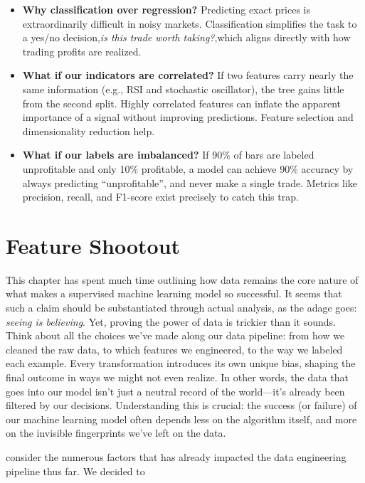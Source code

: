 \begin{tcolorbox}[enhanced, breakable,
  colback=pipegold!8!white,
  colframe=pipegold!80!black,
  fonttitle=\bfseries\sffamily,
  title={Principles and Pitfalls}]
\label{sec:pitfalls}
\begin{itemize}
  \item \textbf{Why classification over regression?} Predicting exact prices is extraordinarily difficult in noisy markets. Classification simplifies the task to a yes/no decision,\textit{is this trade worth taking?},which aligns directly with how trading profits are realized.
  \item \textbf{What if our indicators are correlated?} If two features carry nearly the same information (e.g., RSI and stochastic oscillator), the tree gains little from the second split. Highly correlated features can inflate the apparent importance of a signal without improving predictions. Feature selection and dimensionality reduction help.
  \item \textbf{What if our labels are imbalanced?} If 90\% of bars are labeled unprofitable and only 10\% profitable, a model can achieve 90\% accuracy by always predicting ``unprofitable'', and never make a single trade. Metrics like precision, recall, and F1-score exist precisely to catch this trap.
\end{itemize}
\end{tcolorbox}

\section{Feature Shootout}

This chapter has spent much time outlining how data remains the core nature of what makes a supervised machine learning model so successful. 
It seems that such a claim should be substantiated through actual analysis, as the adage goes: \textit{seeing is believing}.
Yet, proving the power of data is trickier than it sounds. 
Think about all the choices we've made along our data pipeline: from how we cleaned the raw data, to which features we engineered, to the way we labeled each example. 
Every transformation introduces its own unique bias, shaping the final outcome in ways we might not even realize.
In other words, the data that goes into our model isn't just a neutral record of the world—it's already been filtered by our decisions.
Understanding this is crucial: the success (or failure) of our machine learning model often depends less on the algorithm itself, and more on the invisible fingerprints we've left on the data.






consider the numerous factors that has already impacted the data engineering pipeline thus far.
We decided to 

